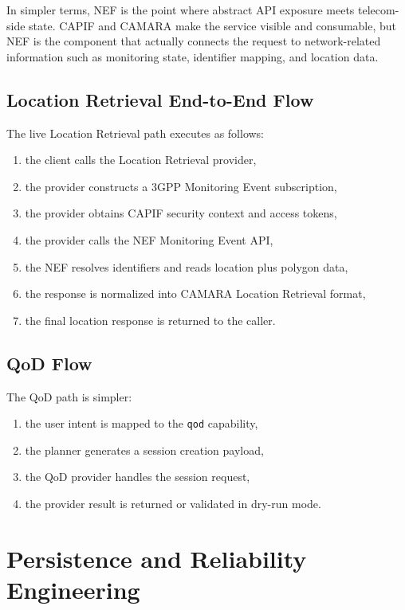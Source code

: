 \documentclass[conference]{IEEEtran}
\begin{document}
In simpler terms, NEF is the point where abstract API exposure meets telecom-side state. CAPIF and CAMARA make the service visible and consumable, but NEF is the component that actually connects the request to network-related information such as monitoring state, identifier mapping, and location data.

\subsection{Location Retrieval End-to-End Flow}

The live Location Retrieval path executes as follows:

\begin{enumerate}[leftmargin=1.1em]
\item the client calls the Location Retrieval provider,
\item the provider constructs a 3GPP Monitoring Event subscription,
\item the provider obtains CAPIF security context and access tokens,
\item the provider calls the NEF Monitoring Event API,
\item the NEF resolves identifiers and reads location plus polygon data,
\item the response is normalized into CAMARA Location Retrieval format,
\item the final location response is returned to the caller.
\end{enumerate}

\subsection{QoD Flow}

The QoD path is simpler:

\begin{enumerate}[leftmargin=1.1em]
\item the user intent is mapped to the \texttt{qod} capability,
\item the planner generates a session creation payload,
\item the QoD provider handles the session request,
\item the provider result is returned or validated in dry-run mode.
\end{enumerate}

\section{Persistence and Reliability Engineering}
\end{document}
